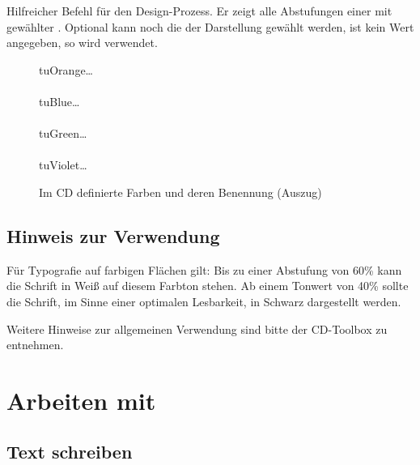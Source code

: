 \begin{Declaration}
\end{Declaration}

Hilfreicher Befehl für den Design-Prozess. Er zeigt alle Abstufungen
einer   mit gewählter 
 .
Optional kann noch die  der Darstellung gewählt werden,
ist kein Wert angegeben, so wird  verwendet.

\begin{figure}
  tuOrange\ldots\\
  \\[-1ex]
  tuBlue\ldots\\
  \\[-1ex]
  tuGreen\ldots\\
  \\[-1ex]
  tuViolet\ldots\\
  \caption{Im CD definierte Farben und deren Benennung (Auszug)}
\end{figure}


\subsection{Hinweis zur Verwendung}

Für Typografie auf farbigen Flächen gilt: Bis zu einer Abstufung von 60\% kann die Schrift in Weiß auf diesem Farbton stehen. Ab einem Tonwert von 40\% sollte die Schrift, im Sinne einer optimalen Lesbarkeit, in Schwarz dargestellt werden. 

Weitere Hinweise zur allgemeinen Verwendung sind bitte der
CD-Toolbox\cite{toolbox} zu entnehmen.


\section{Arbeiten mit \tubslatex}

\subsection{Text schreiben}





